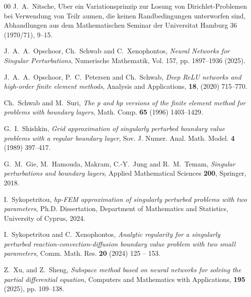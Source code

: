 \documentclass[11pt]{article}
\theoremstyle{plain}
\theoremstyle{definition}
\theoremstyle{remark}
\numberwithin{equation}{section}
\begin{document}
\begin{thebibliography}{00}
 J.~A.~Nitsche, Uber ein Variationsprinzip zur Losung von Dirichlet-Problemen bei Verwendung von Teilr aumen, die keinen Randbedingungen unterworfen sind, Abhandlungen aus dem Mathematischen Seminar der Universitat Hamburg 36 (1970/71), 9--15.

 J.~A.~A.~Opschoor, Ch.~Schwab and C.~Xenophontos, \emph{Neural Networks
for Singular Perturbations}, Numerische Mathematik, Vol. 157, pp. 1897--1936 (2025). 

 J.~A.~A.~Opschoor, P.~C.~Petersen and Ch.~Schwab, \emph{Deep ReLU networks 
and high-order finite element methods}, Analysis and Applications, \textbf{18}, (2020) 715--770.

 Ch.~Schwab and M.~Suri, \emph{The p and hp versions of the
finite element method for problems with boundary layers}, Math. Comp. 
\textbf{65} (1996) 1403--1429.

 G.~I.~Shishkin, \emph{Grid approximation of singularly
perturbed boundary value problems with a regular boundary layer}, Sov. J.
Numer. Anal. Math. Model. \textbf{4} (1989) 397--417.

 G.~M.~Gie, M.~Hamouda, Makram, C.-Y.~Jung and R.~M.~Temam,
\emph{Singular perturbations and boundary layers}, Applied Mathematical Sciences
\textbf{200}, Springer, 2018.

 I.~Sykopetritou, \emph{hp-FEM approximation of singularly
perturbed problems with two parameters}, Ph.D. Dissertation, Department of
Mathematics and Statistics, University of Cyprus, 2024.

 I.~Sykopetritou and C.~Xenophontos, \emph{Analytic regularity for a singularly 
perturbed reaction-convection-diffusion boundary value problem with two small parameters}, 
 Comm. Math. Res. \textbf{20} (2024) 125 -- 153. 
 
 Z.~Xu, and Z.~Sheng, \emph{Subspace method based on neural networks for solving the partial
differential equation}, Computers and Mathematics with Applications, \textbf{195} (2025), pp. 109--138.

\end{thebibliography}
\end{document}
